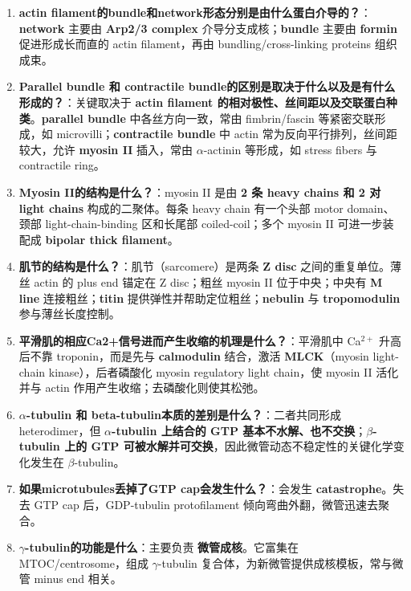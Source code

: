 \documentclass[12pt,fontset=none]{ctexart}
\begin{document}
\begin{enumerate}
\item \textbf{actin filament的bundle和network形态分别是由什么蛋白介导的？}：\textbf{network} 主要由 \textbf{Arp2/3 complex} 介导分支成核；\textbf{bundle} 主要由 \textbf{formin} 促进形成长而直的 actin filament，再由 bundling/cross-linking proteins 组织成束。

\item \textbf{Parallel bundle 和 contractile bundle的区别是取决于什么以及是有什么形成的？}：关键取决于 \textbf{actin filament 的相对极性、丝间距以及交联蛋白种类}。\textbf{parallel bundle} 中各丝方向一致，常由 fimbrin/fascin 等紧密交联形成，如 microvilli；\textbf{contractile bundle} 中 actin 常为反向平行排列，丝间距较大，允许 \textbf{myosin II} 插入，常由 $\alpha$-actinin 等形成，如 stress fibers 与 contractile ring。

\item \textbf{Myosin II的结构是什么？}：myosin II 是由 \textbf{2 条 heavy chains 和 2 对 light chains} 构成的二聚体。每条 heavy chain 有一个头部 motor domain、颈部 light-chain-binding 区和长尾部 coiled-coil；多个 myosin II 可进一步装配成 \textbf{bipolar thick filament}。

\item \textbf{肌节的结构是什么？}：肌节（sarcomere）是两条 \textbf{Z disc} 之间的重复单位。薄丝 actin 的 plus end 锚定在 Z disc；粗丝 myosin II 位于中央；中央有 \textbf{M line} 连接粗丝；\textbf{titin} 提供弹性并帮助定位粗丝；\textbf{nebulin} 与 \textbf{tropomodulin} 参与薄丝长度控制。

\item \textbf{平滑肌的相应Ca2+信号进而产生收缩的机理是什么？}：平滑肌中 Ca$^{2+}$ 升高后不靠 troponin，而是先与 \textbf{calmodulin} 结合，激活 \textbf{MLCK}（myosin light-chain kinase），后者磷酸化 myosin regulatory light chain，使 myosin II 活化并与 actin 作用产生收缩；去磷酸化则使其松弛。

\item \textbf{$\alpha$-tubulin 和 beta-tubulin本质的差别是什么？}：二者共同形成 heterodimer，但 \textbf{$\alpha$-tubulin 上结合的 GTP 基本不水解、也不交换}；\textbf{$\beta$-tubulin 上的 GTP 可被水解并可交换}，因此微管动态不稳定性的关键化学变化发生在 $\beta$-tubulin。

\item \textbf{如果microtubules丢掉了GTP cap会发生什么？}：会发生 \textbf{catastrophe}。失去 GTP cap 后，GDP-tubulin protofilament 倾向弯曲外翻，微管迅速去聚合。

\item \textbf{$\gamma$-tubulin的功能是什么}：主要负责 \textbf{微管成核}。它富集在 MTOC/centrosome，组成 $\gamma$-tubulin 复合体，为新微管提供成核模板，常与微管 minus end 相关。


\end{enumerate}
\end{document}
